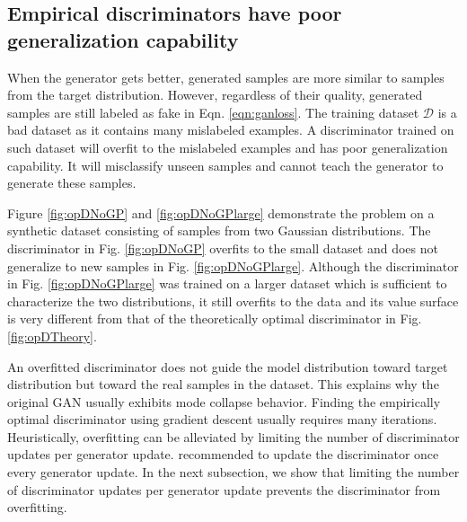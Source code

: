 \documentclass{article} %
\begin{document}
\subsection{Empirical discriminators have poor generalization capability}
When the generator gets better, generated samples are more similar to samples from the target distribution. However, regardless of their quality, generated samples are still labeled as fake in Eqn. \ref{eqn:ganloss}. The training dataset $\mathcal{D}$ is a bad dataset as it contains many mislabeled examples. A discriminator trained on such dataset will overfit to the mislabeled examples and has poor generalization capability. It will misclassify unseen samples and cannot teach the generator to generate these samples. 

Figure \ref{fig:opDNoGP} and \ref{fig:opDNoGPlarge} demonstrate the problem on a synthetic dataset consisting of samples from two Gaussian distributions. The discriminator in Fig. \ref{fig:opDNoGP} overfits to the small dataset and does not generalize to new samples in Fig. \ref{fig:opDNoGPlarge}. Although the discriminator in Fig. \ref{fig:opDNoGPlarge} was trained on a larger dataset which is sufficient to characterize the two distributions, it still overfits to the data and its value surface is very different from that of the theoretically optimal discriminator in Fig. \ref{fig:opDTheory}. 


An overfitted discriminator does not guide the model distribution toward target distribution but toward the real samples in the dataset. This explains why the original GAN usually exhibits mode collapse behavior. Finding the empirically optimal discriminator using gradient descent usually requires many iterations. Heuristically, overfitting can be alleviated by limiting the number of discriminator updates per generator update.
\cite{gan} recommended to update the discriminator once every generator update. In the next subsection, we show that limiting the number of discriminator updates per generator update prevents the discriminator from overfitting.

\end{document}
